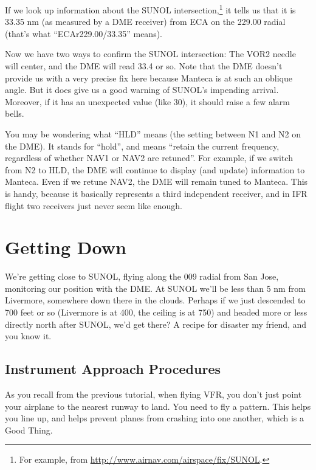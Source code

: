 If we look up information about the SUNOL intersection,\footnote{For
  example, from \url{http://www.airnav.com/airspace/fix/SUNOL}.} it
tells us that it is 33.35 nm (as measured by a DME receiver) from ECA
on the 229.00 radial (that's what ``ECAr229.00/33.35'' means).

Now we have two ways to confirm the SUNOL intersection: The VOR2
needle will center, and the DME will read 33.4 or so.  Note that the
DME doesn't provide us with a very precise fix here because Manteca is
at such an oblique angle.  But it does give us a good warning of
SUNOL's impending arrival.  Moreover, if it has an unexpected value
(like 30), it should raise a few alarm bells.


You may be wondering what ``HLD'' means (the setting between N1 and N2
on the DME).  It stands for ``hold'', and means ``retain the current
frequency, regardless of whether NAV1 or NAV2 are retuned''.  For
example, if we switch from N2 to HLD, the DME will continue to display
(and update) information to Manteca.  Even if we retune NAV2, the DME
will remain tuned to Manteca.  This is handy, because it basically
represents a third independent receiver, and in IFR flight two
receivers just never seem like enough.


\section{Getting Down}

We're getting close to SUNOL, flying along the 009 radial from San
Jose, monitoring our position with the DME.  At SUNOL we'll be less
than 5 nm from Livermore, somewhere down there in the clouds.  Perhaps
if we just descended to 700 feet or so (Livermore is at 400, the
ceiling is at 750) and headed more or less directly north after SUNOL,
we'd get there?  A recipe for disaster my friend, and you know it.

\subsection{Instrument Approach Procedures}

As you recall from the previous tutorial, when flying VFR, you don't
just point your airplane to the nearest runway to land.  You need to
fly a pattern.  This helps you line up, and helps prevent planes from
crashing into one another, which is a Good Thing.

